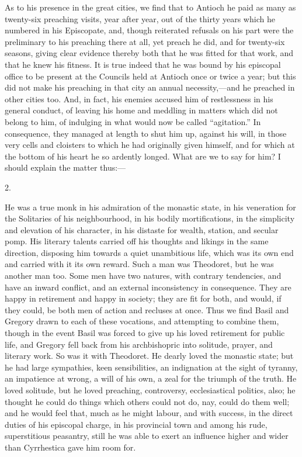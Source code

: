 As to his presence in the great cities, we find that to Antioch he
paid as many as twenty-six preaching visits, year after year, out of
the thirty years which he numbered in his Episcopate, and, though
reiterated refusals on his part were the preliminary to his preaching
there at all, yet preach he did, and for twenty-six seasons, giving
clear evidence thereby both that he was fitted for that work, and that
he knew his fitness. It is true indeed that he was bound by his
episcopal office to be present at the Councils held at Antioch
once or twice a year; but this did not make his preaching in that city
an annual necessity,—and he preached in other cities too. And, in
fact, his enemies accused him of restlessness in his general conduct,
of leaving his home and meddling in matters which did not belong to
him, of indulging in what would now be called ``agitation.''
In consequence, they managed at length to shut him up, against his
will, in those very cells and cloisters to which he had originally
given himself, and for which at the bottom of his heart he so ardently
longed. What are we to say for him? I should explain the matter thus:—

2.

He was a true monk in his admiration of the monastic state, in his
veneration for the Solitaries of his neighbourhood, in his bodily
mortifications, in the simplicity and elevation of his character, in
his distaste for wealth, station, and secular pomp. His literary
talents carried off his thoughts and likings in the same direction,
disposing him towards a quiet unambitious life, which was its own end
and carried with it its own reward. Such a man was Theodoret, but he
was another man too. Some men have two natures, with contrary
tendencies, and have an inward conflict, and an external inconsistency
in consequence. They are happy in retirement and happy in society;
they are fit for both, and would, if they could, be both men of action
and recluses at once. Thus we find Basil and Gregory drawn to each of
these vocations, and attempting to combine them, though in the event
Basil was forced to give up his loved retirement for public life, and
Gregory fell back from his archbishopric into solitude, prayer, and
literary work. So was it with Theodoret. He dearly loved the monastic
state; but he had large sympathies, keen sensibilities, an
indignation at the sight of tyranny, an impatience at wrong, a will of
his own, a zeal for the triumph of the truth. He loved solitude, but
he loved preaching, controversy, ecclesiastical politics, also; he
thought he could do things which others could not do, nay, could do
them well; and he would feel that, much as he might labour, and with
success, in the direct duties of his episcopal charge, in his
provincial town and among his rude, superstitious peasantry, still he
was able to exert an influence higher and wider than Cyrrhestica gave
him room for.

